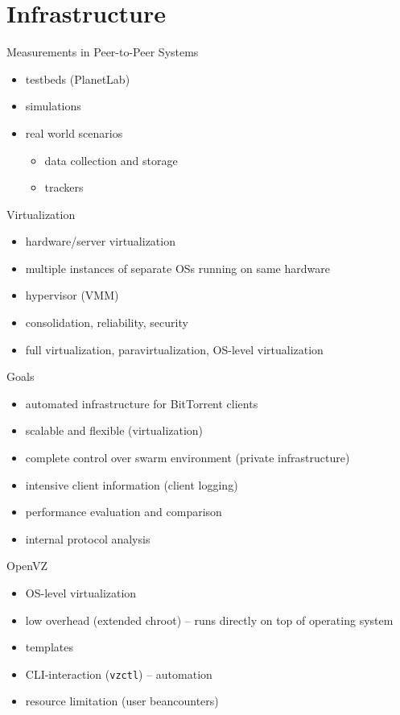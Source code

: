 \documentclass{beamer}
\begin{document}
\section{Infrastructure}

\begin{frame}{Measurements in Peer-to-Peer Systems}
  \begin{itemize}
    \item testbeds (PlanetLab)
    \item simulations
    \item real world scenarios
      \begin{itemize}
        \item data collection and storage
        \item trackers
      \end{itemize}
  \end{itemize}
\end{frame}

\begin{frame}{Virtualization}
  \begin{itemize}
    \item hardware/server virtualization
    \item multiple instances of separate OSs running on same hardware
    \item hypervisor (VMM)
    \item consolidation, reliability, security
    \item full virtualization, paravirtualization, OS-level virtualization
  \end{itemize}
\end{frame}

\begin{frame}{Goals}
  \begin{itemize}
    \item automated infrastructure for BitTorrent clients
    \item scalable and flexible (virtualization)
    \item complete control over swarm environment (private infrastructure)
    \item intensive client information (client logging)
    \item performance evaluation and comparison
    \item internal protocol analysis
  \end{itemize}
\end{frame}

\begin{frame}{OpenVZ}
  \begin{itemize}
    \item OS-level virtualization
    \item low overhead (extended chroot) -- runs directly on top of operating
    system
    \item templates
    \item CLI-interaction (\texttt{vzctl}) -- automation
    \item resource limitation (user beancounters)
  \end{itemize}
\end{frame}
\end{document}
